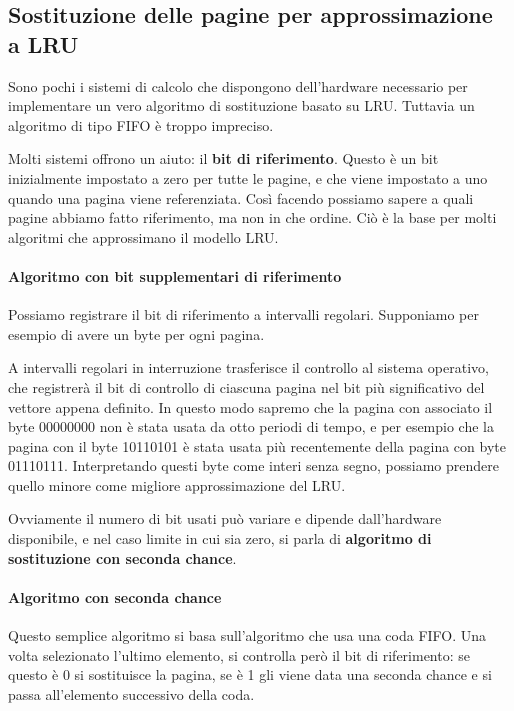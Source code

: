     \subsection{Sostituzione delle pagine per approssimazione a LRU}
        Sono pochi i sistemi di calcolo che dispongono dell'hardware necessario per implementare un vero algoritmo di sostituzione basato su LRU. Tuttavia un algoritmo di tipo FIFO è troppo impreciso.
        
        Molti sistemi offrono un aiuto: il \textbf{bit di riferimento}. Questo è un bit inizialmente impostato a zero per tutte le pagine, e che viene impostato a uno quando una pagina viene referenziata. Così facendo possiamo sapere a quali pagine abbiamo fatto riferimento, ma non in che ordine. Ciò è la base per molti algoritmi che approssimano il modello LRU.
        
        \paragraph{Algoritmo con bit supplementari di riferimento}
            Possiamo registrare il bit di riferimento a intervalli regolari. Supponiamo per esempio di avere un byte per ogni pagina.
            
            A intervalli regolari in interruzione trasferisce il controllo al sistema operativo, che registrerà il bit di controllo di ciascuna pagina nel bit più significativo del vettore appena definito. In questo modo sapremo che la pagina con associato il byte 00000000 non è stata usata da otto periodi di tempo, e per esempio che la pagina con il byte 10110101 è stata usata più recentemente della pagina con byte 01110111. Interpretando questi byte come interi senza segno, possiamo prendere quello minore come migliore approssimazione del LRU.
            
            Ovviamente il numero di bit usati può variare e dipende dall'hardware disponibile, e nel caso limite in cui sia zero, si parla di \textbf{algoritmo di sostituzione con seconda chance}.
            
        \paragraph{Algoritmo con seconda chance}
            Questo semplice algoritmo si basa sull'algoritmo che usa una coda FIFO. Una volta selezionato l'ultimo elemento, si controlla però il bit di riferimento: se questo è 0 si sostituisce la pagina, se è 1 gli viene data una seconda chance e si passa all'elemento successivo della coda.
            
